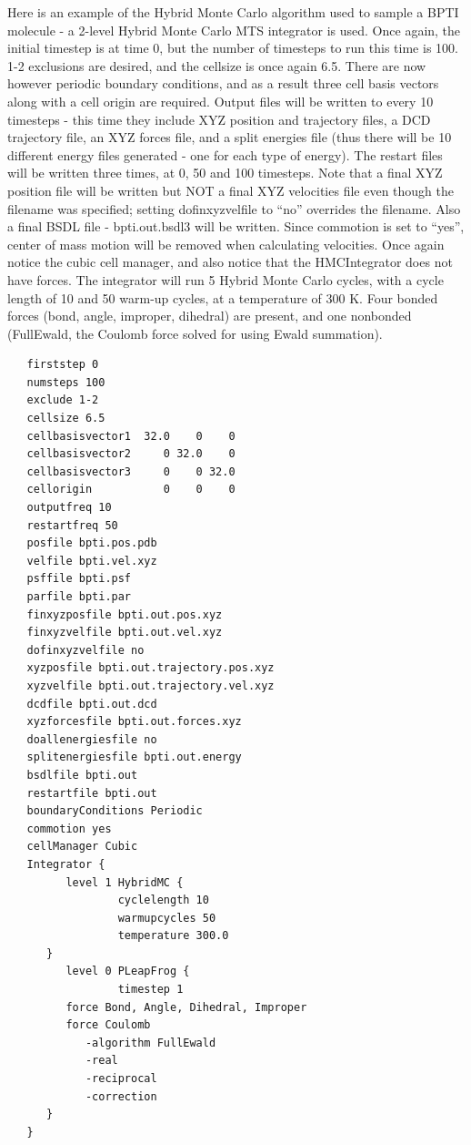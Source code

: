 \documentclass[11pt]{report}
\begin{document}
Here is an example of the Hybrid Monte Carlo algorithm used to sample
a BPTI molecule - a 2-level Hybrid Monte Carlo MTS integrator is used.
Once again, the initial timestep is at time 0, but the number of
timesteps to run this time is 100.  1-2 exclusions are desired, and
the cellsize is once again 6.5.  There are now however periodic
boundary conditions, and as a result three cell basis vectors along
with a cell origin are required.  Output files will be written to
every 10 timesteps - this time they include XYZ position and
trajectory files, a DCD trajectory file, an XYZ forces file, and a
split energies file (thus there will be 10 different energy files
generated - one for each type of energy).  The restart files will be
written three times, at 0, 50 and 100 timesteps.  Note that a final
XYZ position file will be written but NOT a final XYZ velocities file
even though the filename was specified; setting dofinxyzvelfile to
``no'' overrides the filename.  Also a final BSDL file -
bpti.out.bsdl3 will be written.  Since commotion is set to ``yes'',
center of mass motion will be removed when calculating velocities.
Once again notice the cubic cell manager, and also notice that the
HMCIntegrator does not have forces.  The integrator will run 5 Hybrid
Monte Carlo cycles, with a cycle length of 10 and 50 warm-up cycles,
at a temperature of 300 K.  Four bonded forces (bond, angle, improper,
dihedral) are present, and one nonbonded (FullEwald, the Coulomb force
solved for using Ewald summation).
\clearpage
\begin{verbatim}        
   firststep 0
   numsteps 100
   exclude 1-2
   cellsize 6.5
   cellbasisvector1  32.0    0    0
   cellbasisvector2     0 32.0    0
   cellbasisvector3     0    0 32.0
   cellorigin           0    0    0
   outputfreq 10
   restartfreq 50
   posfile bpti.pos.pdb
   velfile bpti.vel.xyz
   psffile bpti.psf
   parfile bpti.par
   finxyzposfile bpti.out.pos.xyz
   finxyzvelfile bpti.out.vel.xyz
   dofinxyzvelfile no
   xyzposfile bpti.out.trajectory.pos.xyz
   xyzvelfile bpti.out.trajectory.vel.xyz
   dcdfile bpti.out.dcd
   xyzforcesfile bpti.out.forces.xyz
   doallenergiesfile no
   splitenergiesfile bpti.out.energy
   bsdlfile bpti.out
   restartfile bpti.out
   boundaryConditions Periodic
   commotion yes
   cellManager Cubic
   Integrator {
         level 1 HybridMC {
                 cyclelength 10
                 warmupcycles 50
                 temperature 300.0
      }
         level 0 PLeapFrog {
                 timestep 1
         force Bond, Angle, Dihedral, Improper
         force Coulomb 
            -algorithm FullEwald 
            -real 
            -reciprocal 
            -correction
      }
   }
\end{verbatim}        
\end{document}

